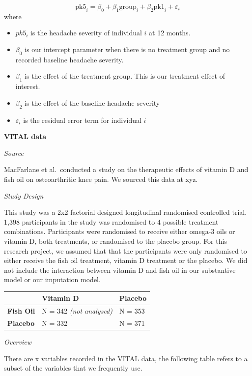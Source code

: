 \documentclass{article}
\providecommand{\tightlist}{%
  \setlength{\itemsep}{0pt}\setlength{\parskip}{0pt}}
\begin{document}
\[\text{pk5}_i = \beta_0 + \beta_1 \text{group}_i + \beta_2 \text{pk1}_i + \varepsilon_i\]
where

\begin{itemize}
\tightlist
\item
  \(pk5_i\) is the headache severity of individual \(i\) at 12 months.
\item
  \(\beta_0\) is our intercept parameter when there is no treatment
  group and no recorded baseline headache severity.
\item
  \(\beta_1\) is the effect of the treatment group. This is our
  treatment effect of interest.
\item
  \(\beta_2\) is the effect of the baseline headache severity
\item
  \(\varepsilon_i\) is the residual error term for individual \(i\)
\end{itemize}

\textbf{VITAL data}

\emph{Source}

MacFarlane et al.~conducted a study on the therapeutic effects of
vitamin D and fish oil on osteoarthritic knee pain. We sourced this data
at xyz.

\emph{Study Design}

This study was a 2x2 factorial designed longitudinal randomised
controlled trial. 1,398 participants in the study was randomised to 4
possible treatment combinations. Participants were randomised to receive
either omega-3 oils or vitamin D, both treatments, or randomised to the
placebo group. For this research project, we assumed that that the
participants were only randomised to either receive the fish oil
treatment, vitamin D treatment or the placebo. We did not include the
interaction between vitamin D and fish oil in our substantive model or
our imputation model.

\begin{longtable}[]{@{}lll@{}}
\toprule\noalign{}
& \textbf{Vitamin D} & \textbf{Placebo} \\
\midrule\noalign{}
\endhead
\bottomrule\noalign{}
\endlastfoot
\textbf{Fish Oil} & N = 342 \emph{(not analysed)} & N = 353 \\
\textbf{Placebo} & N = 332 & N = 371 \\
\end{longtable}

\emph{Overview}

There are x variables recorded in the VITAL data, the following table
refers to a subset of the variables that we frequently use.
\end{document}
